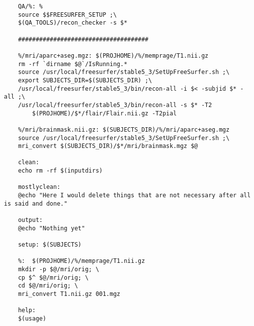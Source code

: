\begin{verbatim}
	QA/%: %
	source $$FREESURFER_SETUP ;\
	$(QA_TOOLS)/recon_checker -s $*
	
	#####################################
	
	%/mri/aparc+aseg.mgz: $(PROJHOME)/%/memprage/T1.nii.gz
	rm -rf `dirname $@`/IsRunning.*
	source /usr/local/freesurfer/stable5_3/SetUpFreeSurfer.sh ;\
	export SUBJECTS_DIR=$(SUBJECTS_DIR) ;\
	/usr/local/freesurfer/stable5_3/bin/recon-all -i $< -subjid $* -all ;\
	/usr/local/freesurfer/stable5_3/bin/recon-all -s $* -T2 
		$(PROJHOME)/$*/flair/Flair.nii.gz -T2pial
		
	%/mri/brainmask.nii.gz: $(SUBJECTS_DIR)/%/mri/aparc+aseg.mgz
	source /usr/local/freesurfer/stable5_3/SetUpFreeSurfer.sh ;\
	mri_convert $(SUBJECTS_DIR)/$*/mri/brainmask.mgz $@
	
	clean:
	echo rm -rf $(inputdirs)
	
	mostlyclean:
	@echo "Here I would delete things that are not necessary after all is said and done."
	
	output: 
	@echo "Nothing yet"
	
	setup: $(SUBJECTS)
	
	%:  $(PROJHOME)/%/memprage/T1.nii.gz 
	mkdir -p $@/mri/orig; \
	cp $^ $@/mri/orig; \
	cd $@/mri/orig; \
	mri_convert T1.nii.gz 001.mgz
	
	help:
	$(usage)
	
	
\end{verbatim}